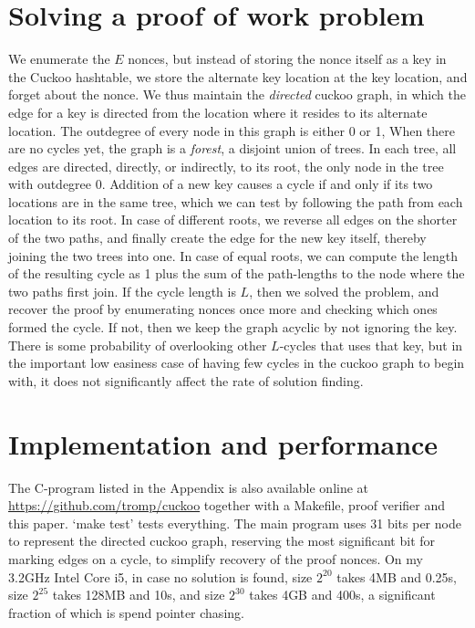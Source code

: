 \documentclass[11pt, oneside]{article}
\begin{document}
\section{Solving a proof of work problem}
We enumerate the $E$ nonces, but instead of storing the nonce itself as a key
in the Cuckoo hashtable, we store the alternate key location at the key location,
and forget about the nonce.
We thus maintain the {\em directed} cuckoo graph, in which the edge for a key
is directed from the location where it resides to its alternate location.
The outdegree of every node in this
graph is either 0 or 1, When there are no cycles yet, the graph is a {\em
forest}, a disjoint union of trees. In each tree, all edges are directed,
directly, or indirectly, to its root,
the only node in the tree with outdegree 0. Addition of a new key causes a
cycle if and only if its two locations are in the same tree, which we can test
by following the path from each location to its root.
In case of different roots, we reverse all edges on the shorter of the two paths,
and finally create the edge for the new key itself, thereby joining the two trees into one.
In case of equal roots, we can compute the length of the resulting cycle as
1 plus the sum of the path-lengths to the node where the two paths first join.
If the cycle length is $L$, then we solved the problem, and recover the proof
by enumerating nonces once more and checking which ones formed the cycle.
If not, then we keep the graph acyclic by not ignoring the key.
There is some probability of overlooking other $L$-cycles
that uses that key, but in the important low easiness case of having few cycles
in the cuckoo graph to begin with, it does not significantly affect
the rate of solution finding.

\section{Implementation and performance}
The C-program listed in the Appendix is also available online at
\url{https://github.com/tromp/cuckoo} together with a Makefile,
proof verifier and this paper. `make test' tests everything.
The main program uses 31 bits per node to represent the
directed cuckoo graph, reserving the most significant bit
for marking edges on a cycle, to simplify recovery of the proof nonces.
On my 3.2GHz Intel Core i5, in case no solution is found, size $2^{20}$ takes 4MB and 0.25s, size
$2^{25}$ takes 128MB and 10s, and size $2^{30}$ takes 4GB and 400s, a significant fraction of which
is spend pointer chasing.
\end{document}
